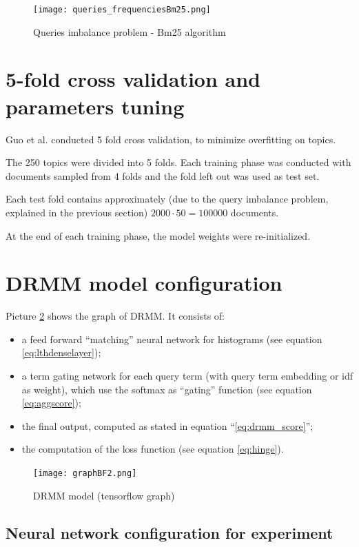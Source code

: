 \begin{figure}[H]
  \centering
  \texttt{[image: queries\_frequenciesBm25.png]}
  \caption{Queries imbalance problem - Bm25 algorithm}
  \label{fig:queries_frequencies_bm}
\end{figure}

\section{5-fold cross validation and parameters tuning}

Guo et al. conducted 5 fold cross validation, to minimize overfitting on topics.

The 250 topics were divided into 5 folds. Each training phase was conducted with documents sampled from 4 folds and the fold left out was used as test set.

Each test fold contains approximately (due to the query imbalance problem, explained in the previous section) $2000 \cdot 50 = 100000$ documents.

At the end of each training phase, the model weights were re-initialized.

\section{DRMM model configuration}

Picture \ref{fig:model_drmm} shows the graph of DRMM. It consists of:

\begin{itemize}
 \item a feed forward ``matching'' neural network for histograms (see equation \ref{eq:lthdenselayer});
 \item a term gating network for each query term (with query term embedding or idf as weight), which use the softmax as ``gating'' function (see equation \ref{eq:aggscore});
 \item the final output, computed as stated in equation ``\ref{eq:drmm_score}'';
 \item the computation of the loss function (see equation \ref{eq:hinge}).
\end{itemize}

\begin{figure}[H]
  \centering
  \texttt{[image: graphBF2.png]}
  \caption{DRMM model (tensorflow graph)}
  \label{fig:model_drmm}
\end{figure}

\subsection{Neural network configuration for experiment}

